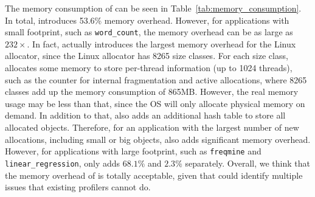 The memory consumption of \MP{} can be seen in Table~\ref{tab:memory_consumption}. In total, 
\MP{} introduces 53.6\% memory overhead. However, for applications with small footprint, such as 
\texttt{word\_count}, the memory overhead can be as large as $232\times$. 
In fact, \MP{} actually introduces 
the largest memory overhead for the Linux allocator, since the Linux allocator has 8265
size classes. For each size class, \MP{} allocates some memory to store per-thread information (up to 1024 threads), such as the counter for internal fragmentation and active allocations,  where 8265 classes add up the memory consumption of 865MB. However, the real memory usage may be less than that, since the OS will only allocate physical memory on demand. In addition to that, \MP{} also adds an additional hash table to store all allocated objects.  Therefore, for an application with the largest number of new allocations, including small or big objects, \MP{} also adds significant memory overhead. 
However, for applications with large footprint, such as \texttt{freqmine} and \texttt{linear\_regression}, \MP{} only adds $68.1\%$ and $2.3\%$ separately. Overall, we think that the memory overhead of \MP{} is totally acceptable, given that \MP{} could identify multiple issues that existing profilers cannot do. 


